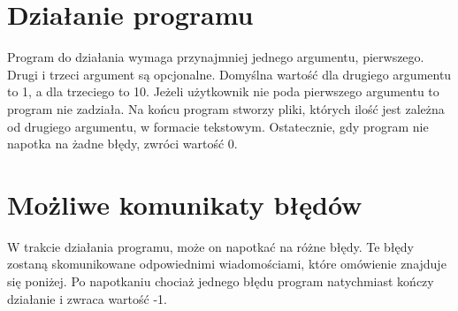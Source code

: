 \documentclass{article}
\begin{document}
\section{Działanie programu}
    Program do działania wymaga przynajmniej jednego argumentu, pierwszego. Drugi i trzeci argument są opcjonalne. Domyślna wartość dla drugiego argumentu to 1, a dla trzeciego to 10. Jeżeli użytkownik nie poda pierwszego argumentu to program nie zadziała. Na końcu program stworzy pliki, których ilość jest zależna od drugiego argumentu, w formacie tekstowym. Ostatecznie, gdy program nie napotka na żadne błędy, zwróci wartość 0.
\section{Możliwe komunikaty błędów}
W trakcie działania programu, może on napotkać na różne błędy. Te błędy zostaną skomunikowane odpowiednimi wiadomościami, które omówienie znajduje się poniżej. Po napotkaniu chociaż jednego błędu program natychmiast kończy działanie i zwraca wartość -1.
\end{document}
